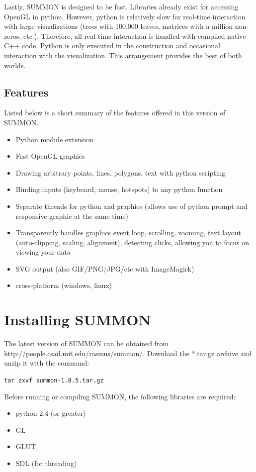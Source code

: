 \documentclass[12pt]{article}
\newcommand{\items}[1]{\begin{itemize} #1 \end{itemize}}
\newcommand{\codeblock}[1]{\vspace{.1in} {\tt #1} \vspace{.1in}}
\newcommand{\version}{1.8.5}
\begin{document}
Lastly, SUMMON is designed to be fast.  Libraries already exist for
accessing OpenGL in python.  However, python is relatively slow for real-time
interaction with large visualizations (trees with 100,000 leaves, matrices with
a million non-zeros, etc.).  Therefore, all real-time interaction is handled
with compiled native C++ code.  Python is only executed in the construction 
and occasional interaction with the visualization.  This arrangement provides 
the best of both worlds.




\subsection{Features}

Listed below is a short summary of the features offered in this version of
SUMMON.

\items{
    \item Python module extension
    \item Fast OpenGL graphics
    \item Drawing arbitrary points, lines, polygons, text with python scripting
    \item Binding inputs (keyboard, mouse, hotspots) to any python function 
    \item Separate threads for python and graphics (allows use of python prompt
          and responsive graphic at the same time)    
    \item Transparently handles graphics event loop, scrolling, zooming, text
          layout (auto-clipping, scaling, alignment), detecting clicks, allowing
          you to focus on viewing your data
    \item SVG output (also GIF/PNG/JPG/etc with ImageMagick)
    \item cross-platform (windows, linux)
}


\section{Installing SUMMON}
\label{sec:installing}

The latest version of SUMMON can be obtained from 
http://people.csail.mit.edu/rasmus/summon/.  Download the *.tar.gz archive and
unzip it with the command:

\codeblock{tar zxvf summon-\version.tar.gz}

Before running or compiling SUMMON, the following libraries are required:
\items {
    \item python 2.4 (or greater)
    \item GL   
    \item GLUT
    \item SDL (for threading)
}
\end{document}
